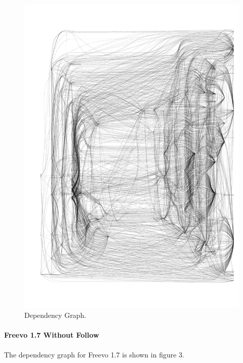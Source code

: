 \documentclass[10.5pt,journal, a4paper]{IEEEtran}
\begin{document}
\begin{figure}[]
 \centering 
 \includegraphics[width=\columnwidth]{19Full}
 \centering 
  \caption {Dependency Graph. }
 \end{figure}
 
 
 
 
 
 
\paragraph{Freevo 1.7 Without Follow}
\noindent

The dependency graph for Freevo 1.7 is shown in figure 3.
\end{document}
